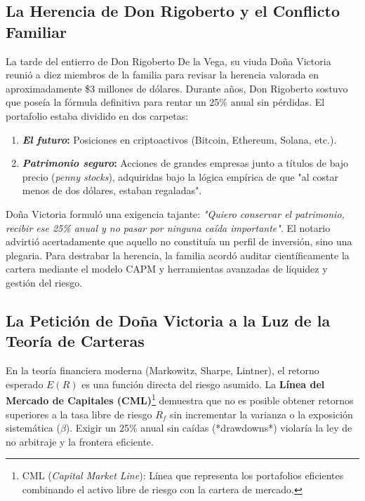 \documentclass[11pt,a4paper]{article}
\begin{document}
\subsection{La Herencia de Don Rigoberto y el Conflicto Familiar}
La tarde del entierro de Don Rigoberto De la Vega, su viuda Doña Victoria reunió a diez miembros de la familia para revisar la herencia valorada en aproximadamente \$3 millones de dólares. Durante años, Don Rigoberto sostuvo que poseía la fórmula definitiva para rentar un 25\% anual sin pérdidas. El portafolio estaba dividido en dos carpetas:
\begin{enumerate}
    \item \textbf{\textit{El futuro}:} Posiciones en criptoactivos (Bitcoin, Ethereum, Solana, etc.).
    \item \textbf{\textit{Patrimonio seguro}:} Acciones de grandes empresas junto a títulos de bajo precio (\textit{penny stocks}), adquiridas bajo la lógica empírica de que "al costar menos de dos dólares, estaban regaladas".
\end{enumerate}

Doña Victoria formuló una exigencia tajante: \textit{"Quiero conservar el patrimonio, recibir ese 25\% anual y no pasar por ninguna caída importante"}. El notario advirtió acertadamente que aquello no constituía un perfil de inversión, sino una plegaria. Para destrabar la herencia, la familia acordó auditar científicamente la cartera mediante el modelo CAPM y herramientas avanzadas de liquidez y gestión del riesgo.

\subsection{La Petición de Doña Victoria a la Luz de la Teoría de Carteras}
En la teoría financiera moderna (Markowitz, Sharpe, Lintner), el retorno esperado $E(R)$ es una función directa del riesgo asumido. La \textbf{Línea del Mercado de Capitales (CML)}\footnote{CML (\textit{Capital Market Line}): Línea que representa los portafolios eficientes combinando el activo libre de riesgo con la cartera de mercado.} demuestra que no es posible obtener retornos superiores a la tasa libre de riesgo $R_f$ sin incrementar la varianza o la exposición sistemática ($\beta$). Exigir un 25\% anual sin caídas (*drawdowns*) violaría la ley de no arbitraje y la frontera eficiente.
\end{document}
